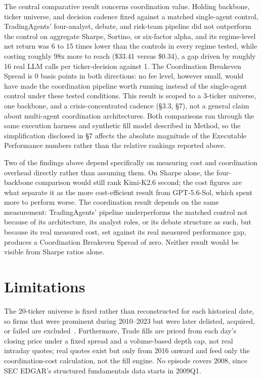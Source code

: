 \documentclass{article}
\begin{document}
The central comparative result concerns coordination value. Holding backbone, ticker universe, and decision cadence fixed against a matched single-agent control, TradingAgents' four-analyst, debate, and risk-team pipeline did not outperform the control on aggregate Sharpe, Sortino, or six-factor alpha, and its regime-level net return was 6 to 15 times lower than the controls in every regime tested, while costing roughly 98x more to reach (\$33.41 versus \$0.34), a gap driven by roughly 16 real LLM calls per ticker-decision against 1. The Coordination Breakeven Spread is 0 basis points in both directions: no fee level, however small, would have made the coordination pipeline worth running instead of the single-agent control under these tested conditions. This result is scoped to a 3-ticker universe, one backbone, and a crisis-concentrated cadence (\S3.3, \S7), not a general claim about multi-agent coordination architectures. Both comparisons ran through the same execution harness and synthetic fill model described in Method, so the simplification disclosed in \S7 affects the absolute magnitude of the Executable Performance numbers rather than the relative rankings reported above.

Two of the findings above depend specifically on measuring cost and coordination overhead directly rather than assuming them. On Sharpe alone, the four-backbone comparison would still rank Kimi-K2.6 second; the cost figures are what separate it as the more cost-efficient result from GPT-5.6-Sol, which spent more to perform worse. The coordination result depends on the same measurement: TradingAgents' pipeline underperforms the matched control not because of its architecture, its analyst roles, or its debate structure as such, but because its real measured cost, set against its real measured performance gap, produces a Coordination Breakeven Spread of zero. Neither result would be visible from Sharpe ratios alone.

\section{Limitations}

The 20-ticker universe is fixed rather than reconstructed for each historical date, so firms that were prominent during 2010--2023 but were later delisted, acquired, or failed are excluded~\cite{brown1992}. Furthermore, Trade fills are priced from each day's closing price under a fixed spread and a volume-based depth cap, not real intraday quotes; real quotes exist but only from 2016 onward and feed only the coordination-cost calculation, not the fill engine. No episode covers 2008, since SEC EDGAR's structured fundamentals data starts in 2009Q1.
\end{document}
